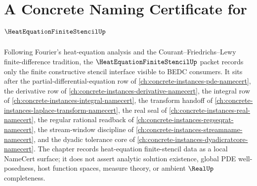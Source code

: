 \chapter{A Concrete Naming Certificate for $\HeatEquationFiniteStencilUp$}
\label{ch:concrete-instances-heat-equation-finite-stencil-namecert}

Following Fourier's heat-equation analysis and the Courant--Friedrichs--Lewy
finite-difference tradition, the $\HeatEquationFiniteStencilUp$ packet records
only the finite constructive stencil interface visible to BEDC consumers. It
sits after the partial-differential-equation row of
\autoref{ch:concrete-instances-pde-namecert}, the derivative row of
\autoref{ch:concrete-instances-derivative-namecert}, the integral row of
\autoref{ch:concrete-instances-integral-namecert}, the transform handoff of
\autoref{ch:concrete-instances-laplace-transform-namecert}, the real seal of
\autoref{ch:concrete-instances-real-namecert}, the regular rational readback
of \autoref{ch:concrete-instances-regseqrat-namecert}, the stream-window
discipline of \autoref{ch:concrete-instances-streamname-namecert}, and the
dyadic tolerance core of \autoref{ch:concrete-instances-dyadicratcore-namecert}.
The chapter records heat-equation finite-stencil data as a local NameCert
surface; it does not assert analytic solution existence, global PDE
well-posedness, host function spaces, measure theory, or ambient
$\RealUp$ completeness.

